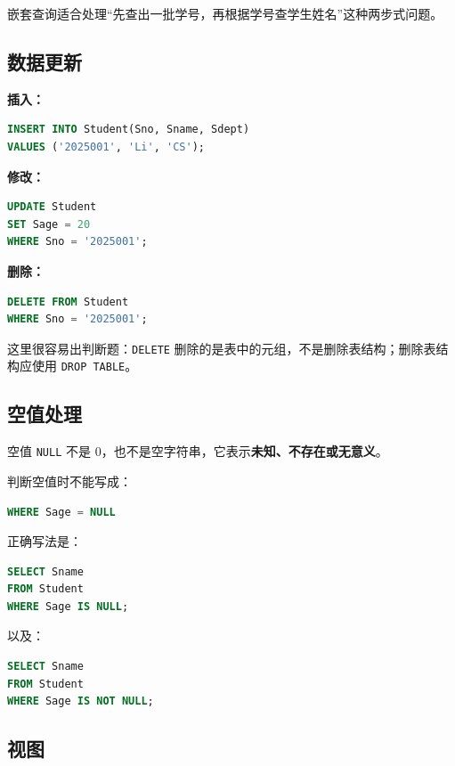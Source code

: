 \documentclass{../../note}
\begin{document}
嵌套查询适合处理“先查出一批学号，再根据学号查学生姓名”这种两步式问题。

\subsection{数据更新}

\textbf{插入：}

\begin{lstlisting}[language=SQL]
INSERT INTO Student(Sno, Sname, Sdept)
VALUES ('2025001', 'Li', 'CS');
\end{lstlisting}

\textbf{修改：}

\begin{lstlisting}[language=SQL]
UPDATE Student
SET Sage = 20
WHERE Sno = '2025001';
\end{lstlisting}

\textbf{删除：}

\begin{lstlisting}[language=SQL]
DELETE FROM Student
WHERE Sno = '2025001';
\end{lstlisting}

这里很容易出判断题：\texttt{DELETE} 删除的是表中的元组，不是删除表结构；删除表结构应使用 \texttt{DROP TABLE}。

\subsection{空值处理}

空值 \texttt{NULL} 不是 0，也不是空字符串，它表示\textbf{未知、不存在或无意义}。

判断空值时不能写成：

\begin{lstlisting}[language=SQL]
WHERE Sage = NULL
\end{lstlisting}

正确写法是：

\begin{lstlisting}[language=SQL]
SELECT Sname
FROM Student
WHERE Sage IS NULL;
\end{lstlisting}

以及：

\begin{lstlisting}[language=SQL]
SELECT Sname
FROM Student
WHERE Sage IS NOT NULL;
\end{lstlisting}

\subsection{视图}
\end{document}
